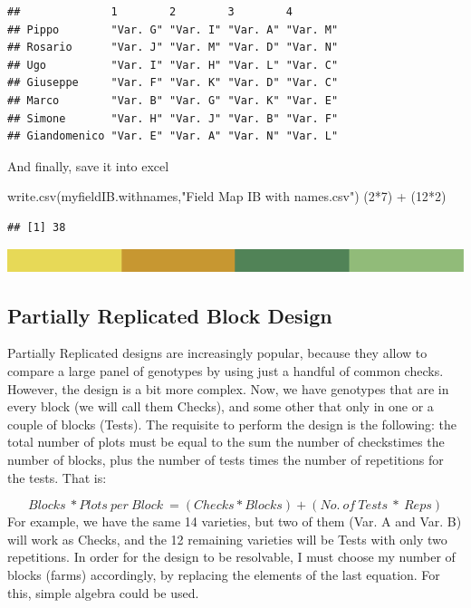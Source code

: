 \documentclass[
]{book}
\newenvironment{Shaded}{\begin{snugshade}}{\end{snugshade}}
\newcommand{\DecValTok}[1]{\textcolor[rgb]{0.00,0.00,0.81}{#1}}
\newcommand{\FunctionTok}[1]{\textcolor[rgb]{0.00,0.00,0.00}{#1}}
\newcommand{\NormalTok}[1]{#1}
\newcommand{\SpecialCharTok}[1]{\textcolor[rgb]{0.00,0.00,0.00}{#1}}
\newcommand{\StringTok}[1]{\textcolor[rgb]{0.31,0.60,0.02}{#1}}
\begin{document}
\begin{verbatim}
##              1        2        3        4       
## Pippo        "Var. G" "Var. I" "Var. A" "Var. M"
## Rosario      "Var. J" "Var. M" "Var. D" "Var. N"
## Ugo          "Var. I" "Var. H" "Var. L" "Var. C"
## Giuseppe     "Var. F" "Var. K" "Var. D" "Var. C"
## Marco        "Var. B" "Var. G" "Var. K" "Var. E"
## Simone       "Var. H" "Var. J" "Var. B" "Var. F"
## Giandomenico "Var. E" "Var. A" "Var. N" "Var. L"
\end{verbatim}

And finally, save it into excel

\begin{Shaded}
\begin{Highlighting}[]
\FunctionTok{write.csv}\NormalTok{(myfieldIB.withnames,}\StringTok{"Field Map IB with names.csv"}\NormalTok{)}
\NormalTok{(}\DecValTok{2}\SpecialCharTok{*}\DecValTok{7}\NormalTok{) }\SpecialCharTok{+}\NormalTok{ (}\DecValTok{12}\SpecialCharTok{*}\DecValTok{2}\NormalTok{)}
\end{Highlighting}
\end{Shaded}

\begin{verbatim}
## [1] 38
\end{verbatim}

\includegraphics{rsrstrip.png}

\hypertarget{partially-replicated-block-design}{%
\subsection{Partially Replicated Block Design}\label{partially-replicated-block-design}}

Partially Replicated designs are increasingly popular, because they allow to compare a large panel of genotypes by using just a handful of common checks. However, the design is a bit more complex. Now, we have genotypes that are in every block (we will call them Checks), and some other that only in one or a couple of blocks (Tests). The requisite to perform the design is the following: the total number of plots must be equal to the sum the number of checkstimes the number of blocks, plus the number of tests times the number of repetitions for the tests. That is:

\[
  Blocks\ * Plots\ per\  Block\ =  ( Checks * Blocks) +  (No.\ of\  Tests\ *\  Reps)
\]
For example, we have the same 14 varieties, but two of them (Var. A and Var. B) will work as Checks, and the 12 remaining varieties will be Tests with only two repetitions. In order for the design to be resolvable, I must choose my number of blocks (farms) accordingly, by replacing the elements of the last equation. For this, simple algebra could be used.
\end{document}
